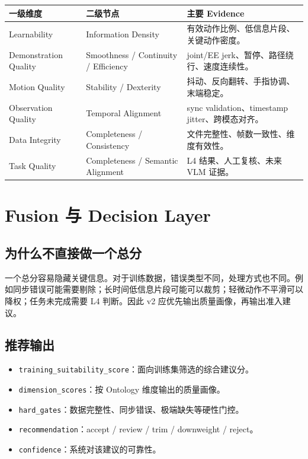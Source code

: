 \documentclass[UTF8,zihao=-4,oneside,openany]{ctexrep}
\newcommand{\Code}[1]{\texttt{#1}}
\begin{document}
\begin{longtable}{L{4cm} L{4cm} L{5.7cm}}
\toprule
一级维度 & 二级节点 & 主要 Evidence \\
\midrule
Learnability & Information Density & 有效动作比例、低信息片段、关键动作密度。 \\
Demonstration Quality & Smoothness / Continuity / Efficiency & joint/EE jerk、暂停、路径绕行、速度连续性。 \\
Motion Quality & Stability / Dexterity & 抖动、反向翻转、手指协调、末端稳定。 \\
Observation Quality & Temporal Alignment & sync validation、timestamp jitter、跨模态对齐。 \\
Data Integrity & Completeness / Consistency & 文件完整性、帧数一致性、维度有效性。 \\
Task Quality & Completeness / Semantic Alignment & L4 结果、人工复核、未来 VLM 证据。 \\
\bottomrule
\end{longtable}

\section{Fusion 与 Decision Layer}

\subsection{为什么不直接做一个总分}

一个总分容易隐藏关键信息。对于训练数据，错误类型不同，处理方式也不同。例如同步错误可能需要剔除；长时间低信息片段可能可以裁剪；轻微动作不平滑可以降权；任务未完成需要 L4 判断。因此 v2 应优先输出质量画像，再输出准入建议。

\subsection{推荐输出}

\begin{itemize}
\item \Code{training\_suitability\_score}：面向训练集筛选的综合建议分。
\item \Code{dimension\_scores}：按 Ontology 维度输出的质量画像。
\item \Code{hard\_gates}：数据完整性、同步错误、极端缺失等硬性门控。
\item \Code{recommendation}：accept / review / trim / downweight / reject。
\item \Code{confidence}：系统对该建议的可靠性。
\end{itemize}
\end{document}

